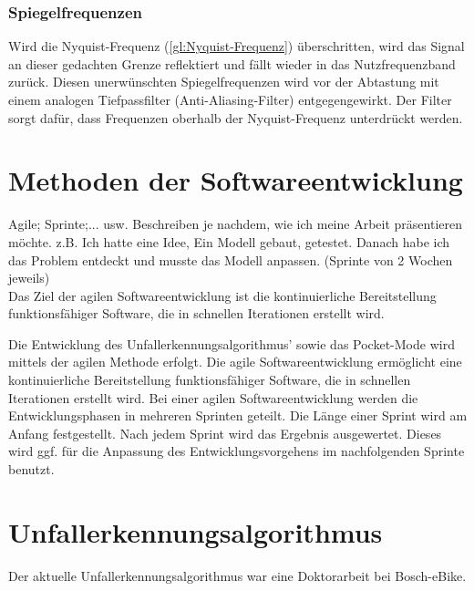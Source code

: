 \subsubsection{Spiegelfrequenzen}
Wird die Nyquist-Frequenz (\autoref{gl:Nyquist-Frequenz}) überschritten, wird das Signal an dieser gedachten Grenze reflektiert und fällt wieder in das Nutzfrequenzband zurück. Diesen unerwünschten Spiegelfrequenzen wird vor der Abtastung mit einem analogen Tiefpassfilter (Anti-Aliasing-Filter) entgegengewirkt. Der Filter sorgt dafür, dass Frequenzen oberhalb der Nyquist-Frequenz unterdrückt werden.






%
%
%
%
%
%
%



\section{Methoden der Softwareentwicklung}\label{abs:MethodenderSoftwareentwicklung}
Agile; Sprinte;... usw.
Beschreiben je nachdem, wie ich meine Arbeit präsentieren möchte.
z.B. Ich hatte eine Idee,  Ein Modell gebaut, getestet. Danach habe ich das Problem entdeckt und musste das Modell anpassen. (Sprinte von 2 Wochen jeweils)\\

Das Ziel der agilen Softwareentwicklung ist die kontinuierliche Bereitstellung funktionsfähiger Software, die in schnellen Iterationen erstellt wird. 

Die Entwicklung des Unfallerkennungsalgorithmus' sowie das Pocket-Mode wird mittels der agilen Methode erfolgt. Die agile Softwareentwicklung ermöglicht eine kontinuierliche Bereitstellung funktionsfähiger Software, die in schnellen Iterationen erstellt wird. Bei einer agilen Softwareentwicklung werden die Entwicklungsphasen in mehreren Sprinten geteilt. Die Länge einer Sprint wird am Anfang festgestellt. Nach jedem Sprint wird das Ergebnis ausgewertet. Dieses wird ggf. für die Anpassung des Entwicklungsvorgehens im nachfolgenden Sprinte benutzt.\cite{Brunskill2019}


%
%
%
%
%
%
%
\section{Unfallerkennungsalgorithmus} %
%
%
%
%
Der aktuelle Unfallerkennungsalgorithmus war eine Doktorarbeit bei Bosch-eBike. \\

